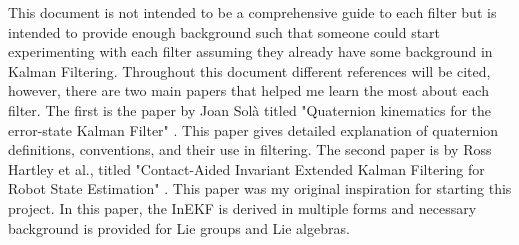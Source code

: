 This document is not intended to be a comprehensive guide to each filter but is intended to provide enough background such that someone could start experimenting with each filter assuming they already have some background in Kalman Filtering. Throughout this document different references will be cited, however, there are two main papers that helped me learn the most about each filter. The first is the paper by Joan Sol{\`{a}} titled "Quaternion kinematics for the error-state Kalman Filter" \cite{Quaternion_Kinematics_for_the_Error-state_EKF}. This paper gives detailed explanation of quaternion definitions, conventions, and their use in filtering. The second paper is by Ross Hartley et al., titled "Contact-Aided Invariant Extended Kalman Filtering for Robot State Estimation" \cite{Contact-Aided_Invarant_EKF}. This paper was my original inspiration for starting this project. In this paper, the InEKF is derived in multiple forms and necessary background is provided for Lie groups and Lie algebras.

